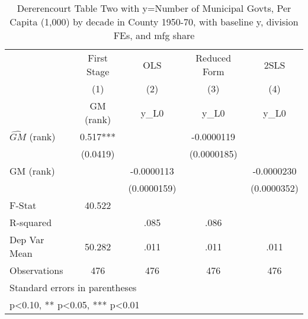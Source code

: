 \begin{table}[htbp]\centering
\def\sym#1{\ifmmode^{#1}\else\(^{#1}\)\fi}
\caption{Dererencourt Table Two with y=Number of Municipal Govts, Per Capita (1,000) by decade in County 1950-70, with baseline y, division FEs, and mfg share}
\begin{tabular}{l*{4}{c}}
\toprule
                    & First Stage   &         OLS   &Reduced Form   &        2SLS   \\
                    &\multicolumn{1}{c}{(1)}&\multicolumn{1}{c}{(2)}&\multicolumn{1}{c}{(3)}&\multicolumn{1}{c}{(4)}\\
                    &\multicolumn{1}{c}{GM  (rank)}&\multicolumn{1}{c}{y\_L0}&\multicolumn{1}{c}{y\_L0}&\multicolumn{1}{c}{y\_L0}\\
\midrule
$\hat{GM}$ (rank)   &       0.517***&               &  -0.0000119   &               \\
                    &    (0.0419)   &               & (0.0000185)   &               \\
\addlinespace
GM  (rank)          &               &  -0.0000113   &               &  -0.0000230   \\
                    &               & (0.0000159)   &               & (0.0000352)   \\
\midrule
F-Stat              &      40.522   &               &               &               \\
R-squared           &               &        .085   &        .086   &               \\
Dep Var Mean        &      50.282   &        .011   &        .011   &        .011   \\
Observations        &         476   &         476   &         476   &         476   \\
\bottomrule
\multicolumn{5}{l}{\footnotesize Standard errors in parentheses}\\
\multicolumn{5}{l}{\footnotesize * p<0.10, ** p<0.05, *** p<0.01}\\
\end{tabular}
\end{table}
